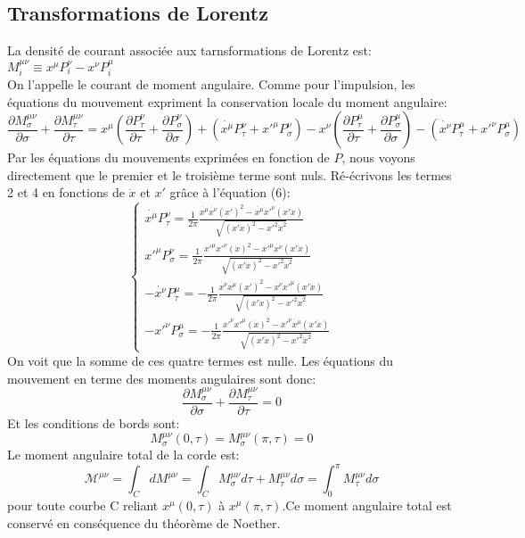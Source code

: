 \documentclass[a4paper,12pt]{article}
\def\xmu{x^\mu}
\begin{document}
\subsection{Transformations de Lorentz}
La densité de courant associée aux tarnsformations de Lorentz est:
$M_{i}^{\mu\nu}\equiv x^{\mu}P^{\nu}_{i}-x^{\nu}P^{\mu}_{i}$\\
On l'appelle le courant de moment angulaire.
Comme pour l'impulsion, les équations du mouvement expriment la conservation locale du moment angulaire:
$$\frac{\partial M_{\sigma}^{\mu\nu}}{\partial \sigma}+\frac{\partial M_{\tau}^{\mu\nu}}{\partial \tau}=x^{\mu}\left( \frac{\partial P^{\nu}_{\tau}}{\partial \tau}+\frac{\partial P^{\nu}_{\sigma}}{\partial \sigma}\right) +\left( \dot{x^{\mu}}P^{\nu}_{\tau}+x'^{\mu}P^{\nu}_{\sigma}\right) -x^{\nu}\left( \frac{\partial P^{\mu}_{\tau}}{\partial \tau}+\frac{\partial P^{\mu}_{\sigma}}{\partial \sigma}\right) -\left( \dot{x^{\nu}}P^{\mu}_{\tau}+x'^{\nu}P^{\mu}_{\sigma}\right)$$
Par les équations du mouvements exprimées en fonction de $P$, nous voyons directement que le premier et le troisième terme sont nuls. 
Ré-écrivons les termes 2 et 4 en fonctions de $\dot{x}$ et $x'$ grâce à l'équation (6):
\begin{equation}
	\left\lbrace
	\begin{aligned}
	\dot{x^{\mu}}P^{\nu}_{\tau}=\frac{1}{2\pi}\frac{\dot{\xmu}\dot{x^\nu}(x')^2-\dot{\xmu}x'^\nu(x'\dot{x})}{\sqrt{(x'\dot{x})^2-x'^2\dot{x}^2}}\\
	x'^{\mu}P^{\nu}_{\sigma}=\frac{1}{2\pi}\frac{x'^\mu x'^\nu (\dot{x})^2-x'^{\mu}\dot{x^\nu}(x'\dot{x})}{\sqrt{(x'\dot{x})^2-x'^2\dot{x}^2}}\\
	-\dot{x^{\nu}}P^{\mu}_{\tau}=-\frac{1}{2\pi}\frac{\dot{x^\nu}\dot{\xmu}(x')^2-\dot{x^\nu}x'^\mu(x'\dot{x})}{\sqrt{(x'\dot{x})^2-x'^2\dot{x}^2}}\\
	-x'^{\nu}P^{\mu}_{\sigma}=-\frac{1}{2\pi}\frac{x'^{\nu}x'^\mu (\dot{x})^2-x'^{\nu}\dot{\xmu}(x'\dot{x})}{\sqrt{(x'\dot{x})^2-x'^2\dot{x}^2}}
	\end{aligned}
	\right.
\end{equation}
On voit que la somme de ces quatre termes est nulle. 
Les équations du mouvement en terme des moments angulaires sont donc:
$$\frac{\partial M_{\sigma}^{\mu\nu}}{\partial \sigma}+\frac{\partial M_{\tau}^{\mu\nu}}{\partial \tau}=0$$
Et les conditions de bords sont:
$$M_{\sigma}^{\mu\nu}(0,\tau)=M_{\sigma}^{\mu\nu}(\pi,\tau)=0$$
Le moment angulaire total de la corde est: 
$$\mathcal{M^{\mu\nu}}=\int_{C}dM^{\mu\nu}=\int_{C}M^{\mu\nu}_{\sigma}d\tau+M^{\mu\nu}_{\tau}d\sigma=\int_{0}^{\pi}M^{\mu\nu}_{\tau}d\sigma$$
pour toute courbe C reliant $x^{\mu}(0,\tau)$ à $x^{\mu}(\pi,\tau)$.Ce moment angulaire total est conservé en conséquence du théorème de Noether.
\end{document}
